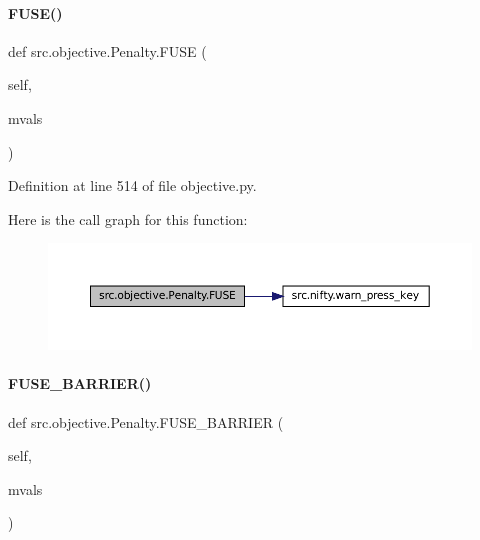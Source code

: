 \mbox{\label{classsrc_1_1objective_1_1Penalty_a190dc5c3843732098b76a6bee4e6d1ec}} 
\paragraph{\texorpdfstring{F\+U\+S\+E()}{FUSE()}}
{\footnotesize\ttfamily def src.\+objective.\+Penalty.\+F\+U\+SE (\begin{DoxyParamCaption}\item[{}]{self,  }\item[{}]{mvals }\end{DoxyParamCaption})}



Definition at line 514 of file objective.\+py.

Here is the call graph for this function\+:
\nopagebreak
\begin{figure}[H]
\begin{center}
\leavevmode
\includegraphics[width=350pt]{classsrc_1_1objective_1_1Penalty_a190dc5c3843732098b76a6bee4e6d1ec_cgraph}
\end{center}
\end{figure}
\mbox{\label{classsrc_1_1objective_1_1Penalty_abb8686b72c5850e731ec5a96003a9237}} 
\paragraph{\texorpdfstring{F\+U\+S\+E\+\_\+\+B\+A\+R\+R\+I\+E\+R()}{FUSE\_BARRIER()}}
{\footnotesize\ttfamily def src.\+objective.\+Penalty.\+F\+U\+S\+E\+\_\+\+B\+A\+R\+R\+I\+ER (\begin{DoxyParamCaption}\item[{}]{self,  }\item[{}]{mvals }\end{DoxyParamCaption})}



